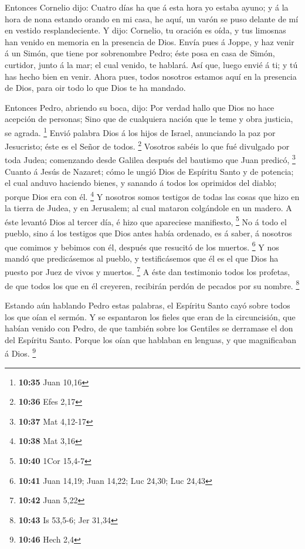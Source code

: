  Entonces Cornelio dijo: Cuatro días ha que á esta hora yo
estaba ayuno; y á la hora de nona estando orando en mi casa, he aquí, un
varón se puso delante de mí en vestido resplandeciente.  Y
dijo: Cornelio, tu oración es oída, y tus limosnas han venido en memoria
en la presencia de Dios.  Envía pues á Joppe, y haz venir á
un Simón, que tiene por sobrenombre Pedro; éste posa en casa de Simón,
curtidor, junto á la mar; el cual venido, te hablará.  Así
que, luego envié á ti; y tú has hecho bien en venir. Ahora pues, todos
nosotros estamos aquí en la presencia de Dios, para oir todo lo que Dios
te ha mandado.

 Entonces Pedro, abriendo su boca, dijo: Por verdad hallo
que Dios no hace acepción de personas;  Sino que de
cualquiera nación que le teme y obra justicia, se agrada. \footnote{\textbf{10:35}
  Juan 10,16}  Envió palabra Dios á los hijos de Israel,
anunciando la paz por Jesucristo; éste es el Señor de todos. \footnote{\textbf{10:36}
  Efes 2,17}  Vosotros sabéis lo que fué divulgado por toda
Judea; comenzando desde Galilea después del bautismo que Juan predicó,
\footnote{\textbf{10:37} Mat 4,12-17}  Cuanto á Jesús de
Nazaret; cómo le ungió Dios de Espíritu Santo y de potencia; el cual
anduvo haciendo bienes, y sanando á todos los oprimidos del diablo;
porque Dios era con él. \footnote{\textbf{10:38} Mat 3,16} 
Y nosotros somos testigos de todas las cosas que hizo en la tierra de
Judea, y en Jerusalem; al cual mataron colgándole en un madero.
 A éste levantó Dios al tercer día, é hizo que apareciese
manifiesto, \footnote{\textbf{10:40} 1Cor 15,4-7}  No á
todo el pueblo, sino á los testigos que Dios antes había ordenado, es á
saber, á nosotros que comimos y bebimos con él, después que resucitó de
los muertos. \footnote{\textbf{10:41} Juan 14,19; Juan 14,22; Luc 24,30;
  Luc 24,43}  Y nos mandó que predicásemos al pueblo, y
testificásemos que él es el que Dios ha puesto por Juez de vivos y
muertos. \footnote{\textbf{10:42} Juan 5,22}  A éste dan
testimonio todos los profetas, de que todos los que en él creyeren,
recibirán perdón de pecados por su nombre. \footnote{\textbf{10:43} Is
  53,5-6; Jer 31,34}

 Estando aún hablando Pedro estas palabras, el Espíritu
Santo cayó sobre todos los que oían el sermón.  Y se
espantaron los fieles que eran de la circuncisión, que habían venido con
Pedro, de que también sobre los Gentiles se derramase el don del
Espíritu Santo.  Porque los oían que hablaban en lenguas, y
que magnificaban á Dios. \footnote{\textbf{10:46} Hech 2,4}

